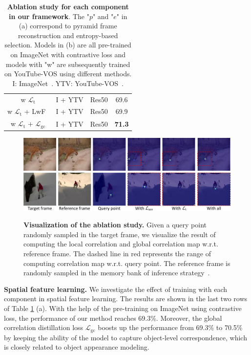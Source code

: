 \documentclass{article}
\begin{document}
\begin{table}[t]
{{\begin{tabular}{@{}cccc@{}}
            w $\mathcal{L}_{\mathrm{t}}$    & I + YTV & Res50 &69.6          \\
            w $\mathcal{L}_{\mathrm{t}}$ + LwF~\cite{li2017learning}            & I + YTV & Res50 &69.9          \\
            w $\mathcal{L}_{\mathrm{t}}$ + $\mathcal{L}_{\mathrm{gc}}$ & I + YTV & Res50 &\textbf{71.3} \\
            \hline
            \end{tabular}%
            }
          }
    \captionsetup{font=small}
    \caption{\textbf{Ablation study for each component in our framework}.  The "$p$" and "$e$" in (a) correspond to pyramid frame reconstruction and entropy-based selection. Models in (b) are all pre-trained on ImageNet with contrastive loss and models with "w" are subsequently trained on YouTube-VOS using different methods. I: ImageNet~\cite{deng2009large}.  YTV: YouTube-VOS~\cite{xu2018youtube}.}
    \label{tab:ablations}\vspace{-2mm}
\end{table}

\begin{figure}[!tb]
  \centering
  {\includegraphics[width=1.0\textwidth]{figure/abalations/ablataions.pdf}}
  \caption{\small \textbf{Visualization of the ablation study.} Given a query point randomly sampled in the target frame, we visualize the result of computing the local correlation and global correlation map w.r.t. reference frame. The dashed line in red represents the range of computing correlation map w.r.t. query point. The reference frame is randomly sampled in the memory bank of inference strategy~\cite{jabri2020space}\cite{lai2020mast}\cite{xu2021rethinking}. }
  \label{fig:ablations}
  \vspace{-7mm}
\end{figure}

\textbf{Spatial feature learning.} We investigate the effect of training with each component in spatial feature learning. The results are shown in the last two rows of Table \ref{tab:ablations} (a). With the help of the pre-training on ImageNet using contrastive loss, the performance of our method reaches 69.3\%. Moreover, the global correlation distillation loss $\mathcal{L}_{\mathrm{gc}}$ boosts up the performance from 69.3\% to 70.5\% by keeping the ability of the model to capture object-level correspondence, which is closely related to object appearance modeling.
 
\end{document}
